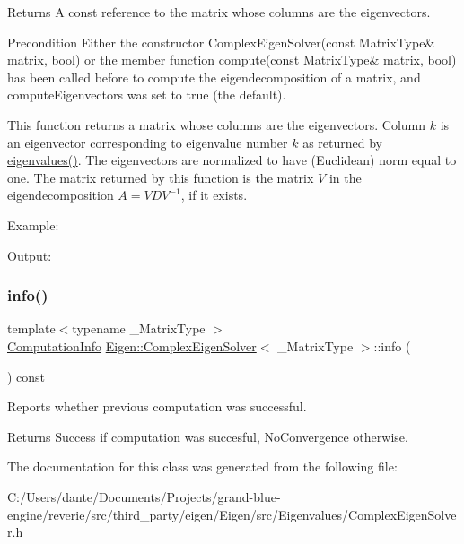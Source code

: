 \begin{DoxyReturn}{Returns}
A const reference to the matrix whose columns are the eigenvectors.
\end{DoxyReturn}
\begin{DoxyPrecond}{Precondition}
Either the constructor Complex\+Eigen\+Solver(const Matrix\+Type\& matrix, bool) or the member function compute(const Matrix\+Type\& matrix, bool) has been called before to compute the eigendecomposition of a matrix, and {\ttfamily compute\+Eigenvectors} was set to true (the default).
\end{DoxyPrecond}
This function returns a matrix whose columns are the eigenvectors. Column $ k $ is an eigenvector corresponding to eigenvalue number $ k $ as returned by \mbox{\hyperlink{class_eigen_1_1_complex_eigen_solver_a10c25c7620e7faedcd39991cce3a757b}{eigenvalues()}}. The eigenvectors are normalized to have (Euclidean) norm equal to one. The matrix returned by this function is the matrix $ V $ in the eigendecomposition $ A = V D V^{-1} $, if it exists.

Example\+: 
\begin{DoxyCodeInclude}{0}
\end{DoxyCodeInclude}
 Output\+: 
\begin{DoxyVerbInclude}
\end{DoxyVerbInclude}
 \mbox{\label{class_eigen_1_1_complex_eigen_solver_ad4d9d8b90145900b9686d2dabbe46730}} 
\subsubsection{\texorpdfstring{info()}{info()}}
{\footnotesize\ttfamily template$<$typename \+\_\+\+Matrix\+Type $>$ \\
\mbox{\hyperlink{group__enums_ga85fad7b87587764e5cf6b513a9e0ee5e}{Computation\+Info}} \mbox{\hyperlink{class_eigen_1_1_complex_eigen_solver}{Eigen\+::\+Complex\+Eigen\+Solver}}$<$ \+\_\+\+Matrix\+Type $>$\+::info (\begin{DoxyParamCaption}{ }\end{DoxyParamCaption}) const\hspace{0.3cm}{\ttfamily [inline]}}



Reports whether previous computation was successful. 

\begin{DoxyReturn}{Returns}
{\ttfamily Success} if computation was succesful, {\ttfamily No\+Convergence} otherwise. 
\end{DoxyReturn}


The documentation for this class was generated from the following file\+:\begin{DoxyCompactItemize}
\item 
C\+:/\+Users/dante/\+Documents/\+Projects/grand-\/blue-\/engine/reverie/src/third\+\_\+party/eigen/\+Eigen/src/\+Eigenvalues/Complex\+Eigen\+Solver.\+h\end{DoxyCompactItemize}
